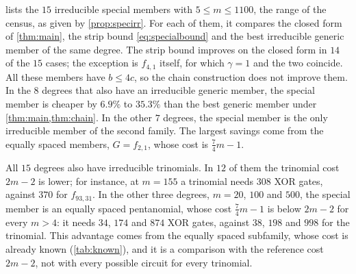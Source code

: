 \documentclass{ieeeaccess}
\theoremstyle{plain}
\theoremstyle{definition}
\begin{document}
 lists the $15$ irreducible special members with
$5\le m\le1100$, the range of the census, as given by \cref{prop:specirr}. For each of them, it compares the
closed form of \cref{thm:main}, the strip bound \eqref{eq:specialbound} and the
best irreducible generic member of the same degree. The strip bound improves on
the closed form in $14$ of the $15$ cases; the exception is $f_{4,1}$ itself,
for which $\gamma=1$ and the two coincide. All these members have $b\le4c$, so
the chain construction does not improve them. In the $8$ degrees that also have
an irreducible generic member, the special member is cheaper by $6.9\%$ to
$35.3\%$ than the best generic member under \cref{thm:main,thm:chain}. In the other $7$ degrees, the special member is the only irreducible
member of the second family. The largest savings come from the equally spaced
members, $G=f_{2,1}$, whose cost is $\tfrac74m-1$.

All $15$ degrees also have irreducible trinomials. In $12$ of them the trinomial
cost $2m-2$ is lower; for instance, at $m=155$ a trinomial needs $308$ XOR gates,
against $370$ for $f_{93,31}$. In the other three degrees, $m=20$, $100$ and
$500$, the special member is an equally spaced pentanomial, whose cost
$\tfrac74m-1$ is below $2m-2$ for every $m>4$: it needs $34$, $174$ and $874$
XOR gates, against $38$, $198$ and $998$ for the trinomial. This advantage comes
from the equally spaced subfamily, whose cost is already known
(\cref{tab:known}), and it is a comparison with the reference cost $2m-2$, not
with every possible circuit for every trinomial.
\end{document}
